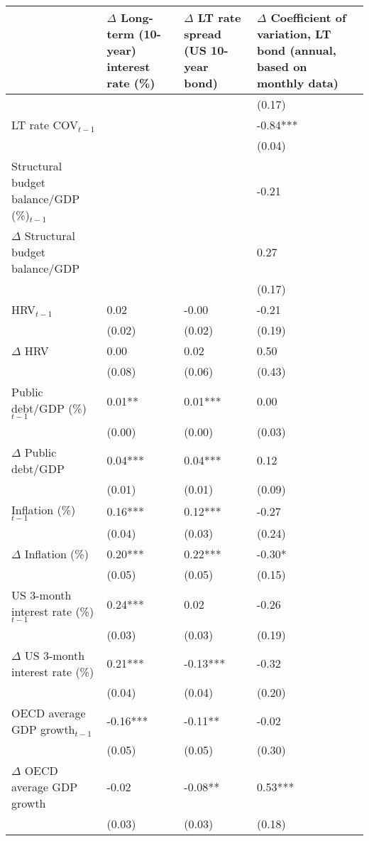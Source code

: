 {\tiny
\begin{tabular}{lp{2cm}p{2cm}p{2cm}}
  \hline
 & $\Delta$ Long-term (10-year) interest rate (\%) & $\Delta$ LT rate spread (US 10-year bond) & $\Delta$ Coefficient of variation, LT bond (annual, based on monthly data) \\ 
  \hline
 &  &  & (0.17) \\ 
  LT rate COV$_{t-1}$ &  &  & -0.84*** \\ 
   &  &  & (0.04) \\ 
  Structural budget balance/GDP (\%)$_{t-1}$ &  &  & -0.21 \\ 
  $\Delta$ Structural budget balance/GDP &  &  & 0.27 \\ 
   &  &  & (0.17) \\ 
  HRV$_{t-1}$ & 0.02 & -0.00 & -0.21 \\ 
   & (0.02) & (0.02) & (0.19) \\ 
  $\Delta$ HRV & 0.00 & 0.02 & 0.50 \\ 
   & (0.08) & (0.06) & (0.43) \\ 
  Public debt/GDP (\%)$_{t-1}$ & 0.01** & 0.01*** & 0.00 \\ 
   & (0.00) & (0.00) & (0.03) \\ 
  $\Delta$ Public debt/GDP & 0.04*** & 0.04*** & 0.12 \\ 
   & (0.01) & (0.01) & (0.09) \\ 
  Inflation (\%) $_{t-1}$ & 0.16*** & 0.12*** & -0.27 \\ 
   & (0.04) & (0.03) & (0.24) \\ 
  $\Delta$ Inflation (\%) & 0.20*** & 0.22*** & -0.30* \\ 
   & (0.05) & (0.05) & (0.15) \\ 
  US 3-month interest rate (\%)$_{t-1}$ & 0.24*** & 0.02 & -0.26 \\ 
   & (0.03) & (0.03) & (0.19) \\ 
  $\Delta$ US 3-month interest rate (\%) & 0.21*** & -0.13*** & -0.32 \\ 
   & (0.04) & (0.04) & (0.20) \\ 
  OECD average GDP growth$_{t-1}$ & -0.16*** & -0.11** & -0.02 \\ 
   & (0.05) & (0.05) & (0.30) \\ 
  $\Delta$ OECD average GDP growth & -0.02 & -0.08** & 0.53*** \\ 
   & (0.03) & (0.03) & (0.18) \\ 

\end{tabular}}
